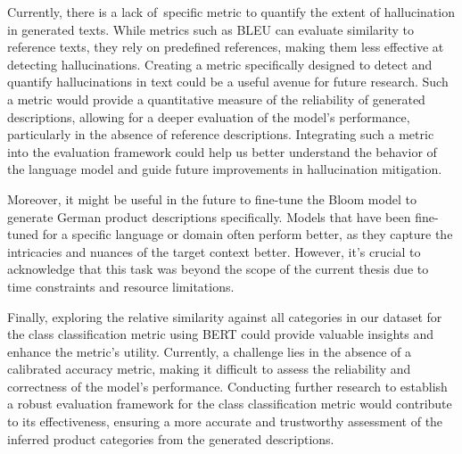 Currently, there is a lack of specific metric to quantify the extent of hallucination in generated texts. While metrics such as BLEU can evaluate similarity to reference texts, they rely on predefined references, making them less effective at detecting hallucinations. Creating a metric specifically designed to detect and quantify hallucinations in text could be a useful avenue for future research. Such a metric would provide a quantitative measure of the reliability of generated descriptions, allowing for a deeper evaluation of the model's performance, particularly in the absence of reference descriptions. Integrating such a metric into the evaluation framework could help us better understand the behavior of the language model and guide future improvements in hallucination mitigation.

Moreover, it might be useful in the future to fine-tune the Bloom model to generate German product descriptions specifically. Models that have been fine-tuned for a specific language or domain often perform better, as they capture the intricacies and nuances of the target context better. However, it's crucial to acknowledge that this task was beyond the scope of the current thesis due to time constraints and resource limitations. 

Finally, exploring the relative similarity against all categories in our dataset for the class classification metric using BERT could provide valuable insights and enhance the metric's utility. Currently, a challenge lies in the absence of a calibrated accuracy metric, making it difficult to assess the reliability and correctness of the model's performance. Conducting further research to establish a robust evaluation framework for the class classification metric would contribute to its effectiveness, ensuring a more accurate and trustworthy assessment of the inferred product categories from the generated descriptions.